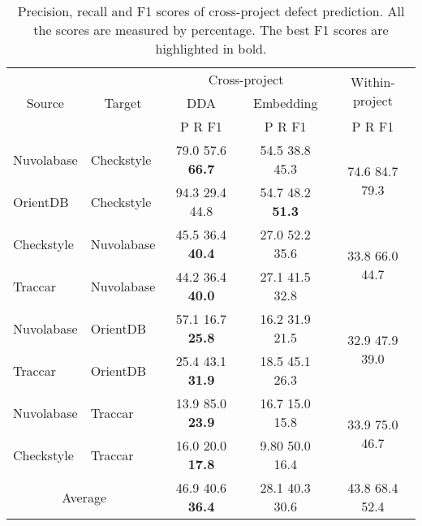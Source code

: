 \begin{table}[t!]
	\centering
	\caption{Precision, recall and F1 scores of cross-project defect prediction. All the scores are measured by percentage. The best F1 scores are highlighted in bold.}
	\begin{adjustbox}{width=0.48\textwidth}
	\begin{tabular}{|c|c|c|c|c|}
		\hline
		\multirow{3}[6]{*}{Source } & \multirow{3}[6]{*}{Target} & \multicolumn{2}{c|}{Cross-project} & \multirow{2}[4]{*}{Within-project} \\
		\cline{3-4}          &       & DDA & Embedding &  \\
		\cline{3-5}          &       & P R F1 & P R F1 & P R F1 \\
		\hline
		\hline
		\multicolumn{1}{|l|}{Nuvolabase} & \multicolumn{1}{l|}{Checkstyle} & 79.0 57.6 \textbf{66.7} & 54.5 38.8 45.3  & \multirow{2}[4]{*}{74.6 84.7 79.3} \\
		\cline{1-4}    \multicolumn{1}{|l|}{OrientDB} & \multicolumn{1}{l|}{Checkstyle} & 94.3 29.4 44.8 & 54.7 48.2 \textbf{51.3} &  \\
		\hline
		\multicolumn{1}{|l|}{Checkstyle} & \multicolumn{1}{l|}{Nuvolabase} & 45.5 36.4\textbf{ 40.4} & 27.0 52.2 35.6 & \multirow{2}[4]{*}{33.8 66.0 44.7} \\		
		\cline{1-4}    \multicolumn{1}{|l|}{Traccar} & \multicolumn{1}{l|}{Nuvolabase} & 44.2 36.4 \textbf{40.0} & 27.1 41.5 32.8 &  \\
		\hline
		\multicolumn{1}{|l|}{Nuvolabase} & \multicolumn{1}{l|}{OrientDB} & 57.1 16.7\textbf{ 25.8}  & 16.2 31.9 21.5 & \multirow{2}[4]{*}{32.9 47.9 39.0} \\
		\cline{1-4}    \multicolumn{1}{|l|}{Traccar} & \multicolumn{1}{l|}{OrientDB} & 25.4 43.1 \textbf{31.9} & 18.5 45.1 26.3 &  \\
		\hline
		\multicolumn{1}{|l|}{Nuvolabase} & \multicolumn{1}{l|}{Traccar} & 13.9 85.0 \textbf{23.9} & 16.7 15.0 15.8 & \multirow{2}[4]{*}{33.9 75.0 46.7} \\
		\cline{1-4}    \multicolumn{1}{|l|}{Checkstyle} & \multicolumn{1}{l|}{Traccar} & 16.0 20.0 \textbf{17.8} & 9.80 50.0 16.4 &  \\
		\hline
		\hline
		\multicolumn{2}{|c|}{Average} & 46.9 40.6 \textbf{36.4} & 28.1 40.3 30.6 & 43.8 68.4 52.4 \\
		\hline
	\end{tabular}%
	\end{adjustbox}
	\label{tab:cross}%
\end{table}%

